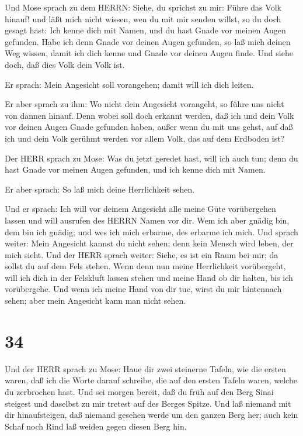  Und Mose sprach zu dem HERRN: Siehe, du sprichst zu mir:
Führe das Volk hinauf! und läßt mich nicht wissen, wen du mit mir senden
willst, so du doch gesagt hast: Ich kenne dich mit Namen, und du hast
Gnade vor meinen Augen gefunden.  Habe ich denn Gnade vor
deinen Augen gefunden, so laß mich deinen Weg wissen, damit ich dich
kenne und Gnade vor deinen Augen finde. Und siehe doch, daß dies Volk
dein Volk ist.

 Er sprach: Mein Angesicht soll vorangehen; damit will ich
dich leiten.

 Er aber sprach zu ihm: Wo nicht dein Angesicht vorangeht,
so führe uns nicht von dannen hinauf.  Denn wobei soll doch
erkannt werden, daß ich und dein Volk vor deinen Augen Gnade gefunden
haben, außer wenn du mit uns gehst, auf daß ich und dein Volk gerühmt
werden vor allem Volk, das auf dem Erdboden ist?

 Der HERR sprach zu Mose: Was du jetzt geredet hast, will
ich auch tun; denn du hast Gnade vor meinen Augen gefunden, und ich
kenne dich mit Namen.

 Er aber sprach: So laß mich deine Herrlichkeit sehen.

 Und er sprach: Ich will vor deinem Angesicht alle meine
Güte vorübergehen lassen und will ausrufen des HERRN Namen vor dir. Wem
ich aber gnädig bin, dem bin ich gnädig; und wes ich mich erbarme, des
erbarme ich mich.  Und sprach weiter: Mein Angesicht kannst
du nicht sehen; denn kein Mensch wird leben, der mich sieht.
 Und der HERR sprach weiter: Siehe, es ist ein Raum bei
mir; da sollst du auf dem Fels stehen.  Wenn denn nun meine
Herrlichkeit vorübergeht, will ich dich in der Felskluft lassen stehen
und meine Hand ob dir halten, bis ich vorübergehe.  Und
wenn ich meine Hand von dir tue, wirst du mir hintennach sehen; aber
mein Angesicht kann man nicht sehen.

\hypertarget{section-33}{%
\section{34}\label{section-33}}

 Und der HERR sprach zu Mose: Haue dir zwei steinerne
Tafeln, wie die ersten waren, daß ich die Worte darauf schreibe, die auf
den ersten Tafeln waren, welche du zerbrochen hast.  Und sei
morgen bereit, daß du früh auf den Berg Sinai steigest und daselbst zu
mir tretest auf des Berges Spitze.  Und laß niemand mit dir
hinaufsteigen, daß niemand gesehen werde um den ganzen Berg her; auch
kein Schaf noch Rind laß weiden gegen diesen Berg hin.

